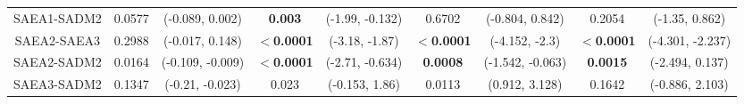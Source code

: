 \begin{landscape}
\begin{table}[]
\begin{tabular}{ccccccccc}
						SAEA1-SADM2 & 0.0577 & (-0.089, 0.002) & \textbf{0.003} & (-1.99, -0.132) &  0.6702  & (-0.804, 0.842) & 0.2054  & (-1.35, 0.862) \\\rowcolor{gray2}
						SAEA2-SAEA3 & 0.2988 & (-0.017, 0.148) & $\boldsymbol{<}$\textbf{0.0001} & (-3.18, -1.87) & $\boldsymbol{<}$\textbf{0.0001} & (-4.152, -2.3) & $\boldsymbol{<}$\textbf{0.0001} & (-4.301, -2.237) \\\rowcolor{gray1}
						SAEA2-SADM2 & 0.0164 & (-0.109, -0.009) & $\boldsymbol{<}$\textbf{0.0001} & (-2.71, -0.634) & \textbf{0.0008} & (-1.542, -0.063) & \textbf{0.0015} & (-2.494, 0.137) \\\rowcolor{gray2}
						SAEA3-SADM2 & 0.1347 & (-0.21, -0.023) & 0.023 & (-0.153, 1.86) & 0.0113 & (0.912, 3.128) & 0.1642 & (-0.886, 2.103)
					\end{tabular}
					\label{tab:results:benchmark:zetaeoe:pvalues}
				\end{table}
			

\end{landscape}

